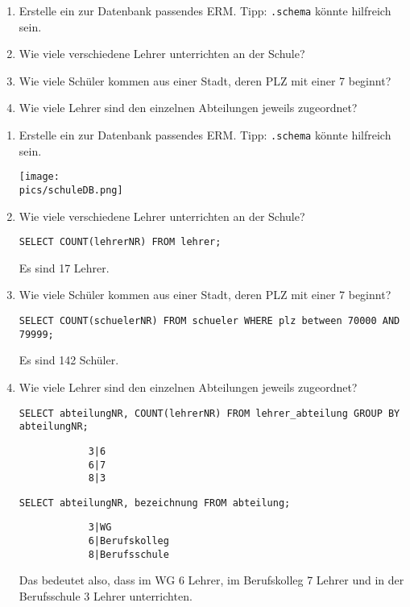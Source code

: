 \begin{Exercise}[title={Bearbeite folgende Aufgaben}, label=Funktionen]
	\begin{enumerate}
		\item Erstelle ein zur Datenbank passendes ERM. Tipp: \lstinline!.schema! könnte hilfreich sein.
		\item Wie viele verschiedene Lehrer unterrichten an der Schule?
		\item Wie viele Schüler kommen aus einer Stadt, deren PLZ mit einer 7 beginnt?
		\item Wie viele Lehrer sind den einzelnen Abteilungen jeweils zugeordnet?
	\end{enumerate}
\end{Exercise}
\begin{Answer}[ref=Funktionen]
	\begin{enumerate}
		\item Erstelle ein zur Datenbank passendes ERM. Tipp: \lstinline!.schema! könnte hilfreich sein.

		\texttt{[image: \\pics/schuleDB.png]}
		\item Wie viele verschiedene Lehrer unterrichten an der Schule?

		\lstinline!SELECT COUNT(lehrerNR) FROM lehrer;!

		Es sind 17 Lehrer.
		\item Wie viele Schüler kommen aus einer Stadt, deren PLZ mit einer 7 beginnt?

		\lstinline!SELECT COUNT(schuelerNR) FROM schueler WHERE plz between 70000 AND 79999;!

		Es sind 142 Schüler.
		\item Wie viele Lehrer sind den einzelnen Abteilungen jeweils zugeordnet?

		\lstinline!SELECT abteilungNR, COUNT(lehrerNR) FROM lehrer_abteilung GROUP BY abteilungNR;!

		\begin{lstlisting}
			3|6
			6|7
			8|3\end{lstlisting}
		\lstinline!SELECT abteilungNR, bezeichnung FROM abteilung;!\\
		\begin{lstlisting}
			3|WG
			6|Berufskolleg
			8|Berufsschule\end{lstlisting}
		Das bedeutet also, dass im WG 6 Lehrer, im Berufskolleg 7 Lehrer und in der Berufsschule 3 Lehrer unterrichten.
	\end{enumerate}
\end{Answer}
